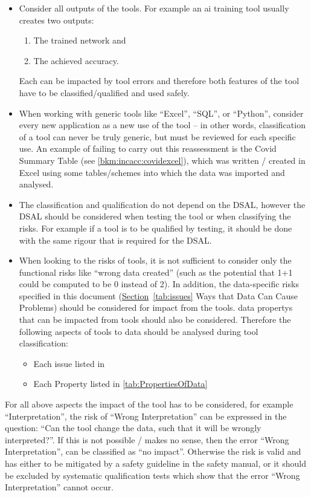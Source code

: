 \begin{itemize}
\item Consider all outputs of the tools.
  For example an \gls{ai} training tool usually creates two outputs:
  \begin{enumerate}
  \item The trained network and
  \item The achieved \gls{accuracy}.
  \end{enumerate}
  Each can be impacted by tool errors and therefore both features of the tool have to be classified/qualified  and used safely.
\item When working with generic tools like ``Excel'', ``SQL'', or ``Python'',
consider every new application as a new use of the tool -- in other words, classification of a tool can never be truly generic, but must be reviewed for each specific use. 
  An example of failing to carry out this reassessment is the Covid Summary Table (see \autoref{bkm:incacc:covidexcel}),
  which was written / created in Excel using some tables/schemes into which the data was imported and analysed.
\item The classification and qualification do not depend on the DSAL, however the DSAL should be considered when testing the tool or when classifying the risks.
  For example if a tool is to be qualified by testing, it should be done with the same rigour that is required  for the DSAL. 
\item When looking to the risks of tools, it is not sufficient to consider only the functional risks like ``wrong data created''
  (such as the potential that 1+1 could be computed to be 0 instead of 2).
  In addition, the data-specific risks specified in this document
  (\hyperref[tab:issues]{Section}~\ref{tab:issues} Ways that Data Can Cause  Problems) should be considered for impact from the tools.
  \Glspl{data property} that can be impacted from tools should also be considered.
  Therefore the following aspects of tools to data should be analysed during tool classification:
  \begin{itemize}
  \item Each issue listed in 
  \item Each Property listed in \autoref{tab:PropertiesOfData}
  \end{itemize}    
\end{itemize}

For all above aspects the impact of the tool has to be considered, for example ``Interpretation'',
the risk of ``Wrong Interpretation'' can be expressed in the question:
``Can the tool change the data, such that it will be wrongly interpreted?''.
If this is not possible / makes no sense, then the error ``Wrong Interpretation'', can be classified as ``no impact''.
Otherwise the risk is valid and has either to be mitigated by a safety guideline in the safety manual,
or it should be excluded by systematic qualification  tests which show that the error ``Wrong Interpretation'' cannot occur.  

